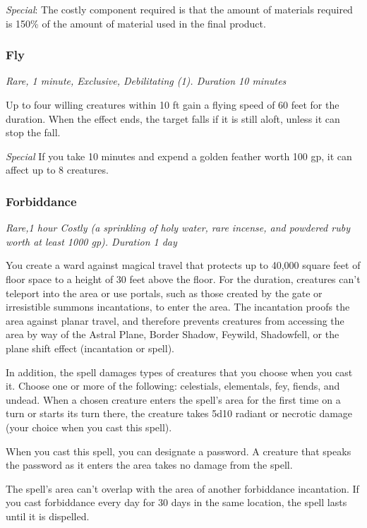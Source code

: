 \textit{Special}: The costly component required is that the amount of materials required is 150\% of the amount of material used in the final product.

\subsubsection{Fly} \label{inc:fly}
\textit{Rare, 1 minute, Exclusive, Debilitating (1). Duration 10 minutes}

Up to four willing creatures within 10 ft gain a flying speed of 60 feet for the duration. When the effect ends, the target falls if it is still aloft, unless it can stop the fall.

\textit{Special} If you take 10 minutes and expend a golden feather worth 100 gp, it can affect up to 8 creatures.

\subsubsection{Forbiddance}
\textit{Rare,1 hour Costly (a sprinkling of holy water, rare incense, and powdered ruby worth at least 1000 gp). Duration 1 day}

You create a ward against magical travel that protects up to 40,000 square feet of floor space to a height of 30 feet above the floor. For the duration, creatures can't teleport into the area or use portals, such as those created by the gate or irresistible summons incantations, to enter the area. The incantation proofs the area against planar travel, and therefore prevents creatures from accessing the area by way of the Astral Plane, Border Shadow, Feywild, Shadowfell, or the plane shift effect (incantation or spell).

In addition, the spell damages types of creatures that you choose when you cast it. Choose one or more of the following: celestials, elementals, fey, fiends, and undead. When a chosen creature enters the spell's area for the first time on a turn or starts its turn there, the creature takes 5d10 radiant or necrotic damage (your choice when you cast this spell).

When you cast this spell, you can designate a password. A creature that speaks the password as it enters the area takes no damage from the spell.

The spell's area can't overlap with the area of another forbiddance incantation. If you cast forbiddance every day for 30 days in the same location, the spell lasts until it is dispelled.

